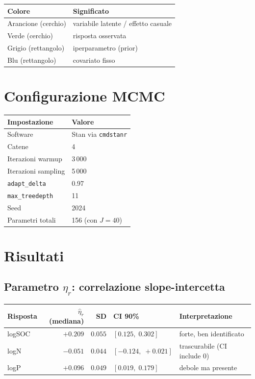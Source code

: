 \documentclass[11pt, a4paper]{article}
\begin{document}
\medskip
\noindent
\begin{tabular}{@{}ll@{}}
\toprule
Colore & Significato \\
\midrule
Arancione (cerchio) & variabile latente / effetto casuale \\
Verde (cerchio) & risposta osservata \\
Grigio (rettangolo) & iperparametro (prior) \\
Blu (rettangolo) & covariato fisso \\
\bottomrule
\end{tabular}

\section{Configurazione MCMC}

\begin{tabular}{@{}ll@{}}
\toprule
Impostazione & Valore \\
\midrule
Software & Stan via \texttt{cmdstanr} \\
Catene & 4 \\
Iterazioni warmup & 3\,000 \\
Iterazioni sampling & 5\,000 \\
\texttt{adapt\_delta} & 0.97 \\
\texttt{max\_treedepth} & 11 \\
Seed & 2024 \\
Parametri totali & 156 (con $J = 40$) \\
\bottomrule
\end{tabular}

\section{Risultati}

\subsection{Parametro $\eta_r$: correlazione slope-intercetta}

\begin{center}
\begin{tabular}{@{}lrrll@{}}
\toprule
Risposta & $\hat{\eta}_r$ (mediana) & SD & CI 90\% & Interpretazione \\
\midrule
logSOC & $+0.209$ & $0.055$ & $[0.125,\; 0.302]$ & forte, ben identificato \\
logN   & $-0.051$ & $0.044$ & $[-0.124,\; +0.021]$ & trascurabile (CI include 0) \\
logP   & $+0.096$ & $0.049$ & $[0.019,\; 0.179]$ & debole ma presente \\
\bottomrule
\end{tabular}
\end{center}
\end{document}
